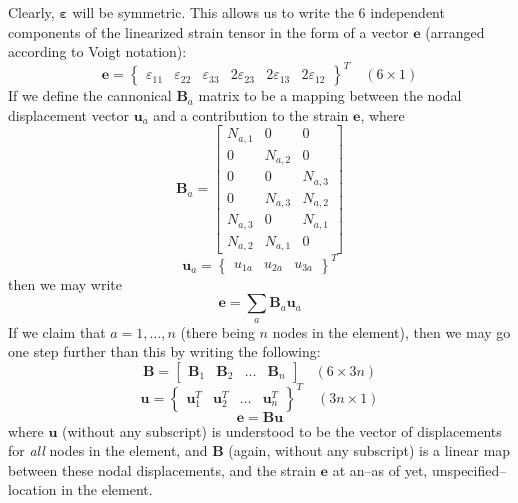 \documentclass[11pt]{article} %
\begin{document}
Clearly, $\mathbf{\varepsilon}$ will be symmetric. This allows us to write the 6 independent components of the linearized strain tensor in the form of a vector $\mathbf{e}$ (arranged according to Voigt notation):
\begin{equation}
	\mathbf{e} = \left\{ \begin{array}{cccccc} \varepsilon_{11} & \varepsilon_{22} & \varepsilon_{33} & 2 \varepsilon_{23} & 2 \varepsilon_{13} & 2 \varepsilon_{12} \end{array} \right\}^T  \quad (6 \times 1)
\end{equation}
If we define the cannonical $\mathbf{B}_a$ matrix to be a mapping between the nodal displacement vector $\mathbf{u}_a$ and a contribution to the strain $\mathbf{e}$, where
\begin{equation}
	\mathbf{B}_a = \left[ \begin{array}{ccc} N_{a,1} & 0 & 0 \\ 0 & N_{a,2} & 0 \\ 0 & 0 & N_{a,3} \\ 0 & N_{a,3} & N_{a,2} \\ N_{a,3} & 0 & N_{a,1} \\ N_{a,2} & N_{a,1} & 0 \end{array} \right]
\end{equation}
\begin{equation}
	\mathbf{u}_a = \left\{ \begin{array}{ccc} u_{1a} & u_{2a} & u_{3a} \end{array} \right\}^T
\end{equation}
then we may write
\begin{equation}
	\mathbf{e} = \sum_a \mathbf{B}_a \mathbf{u}_a
\end{equation}
If we claim that $a = 1, \ldots, n$ (there being $n$ nodes in the element), then we may go one step further than this by writing the following:
\begin{equation}
	\mathbf{B} = \left[ \begin{array}{cccc} \mathbf{B}_1 & \mathbf{B}_2 & \ldots & \mathbf{B}_n \end{array} \right] \quad (6 \times 3n)
\end{equation}
\begin{equation}
	\mathbf{u} = \left\{ \begin{array}{cccc} \mathbf{u}_1^T & \mathbf{u}_2^T & \ldots & \mathbf{u}_n^T \end{array} \right\}^T \quad (3n \times 1)
\end{equation}
\begin{equation}
	\mathbf{e} = \mathbf{B} \mathbf{u}
\end{equation}
where $\mathbf{u}$ (without any subscript) is understood to be the vector of displacements for \textit{all} nodes in the element, and $\mathbf{B}$ (again, without any subscript) is a linear map between these nodal displacements, and the strain $\mathbf{e}$ at an--as of yet, unspecified--location in the element.
\end{document}
